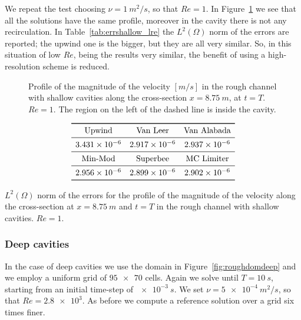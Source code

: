 We repeat the test choosing $\nu=\SI{1}{m^2/s}$, so that $Re=1$. In 
Figure~\ref{fig:linecompshallowlre} we see that all the solutions have the same 
profile, moreover in the cavity there is not any recirculation. In 
Table~\ref{tab:errshallow_lre} the $L^2(\Omega)$ norm of the errors are 
reported; the 
upwind one is 
the bigger, but they are all very similar. So, in this situation of low $Re$, 
being the results very similar, the benefit of using a high-resolution scheme 
is reduced.
\begin{figure}
	\centering
	
	\caption[Profile of the magnitude of the velocity in the rough channel with 
	shallow cavities at $Re=1$]{Profile of the magnitude of the velocity 
	$[\si{m/s}]$ in the rough channel with shallow cavities along the 
	cross-section 
	$x=\SI{8.75}{m}$, at $t=T$. $Re=1$. The region on the left of the 
	dashed line is inside the cavity.}
	\label{fig:linecompshallowlre}
\end{figure}
\begin{table}
	\centering
	\[
	\begin{array}{ccc}
	\toprule
	\text{Upwind} & \text{Van Leer} & \text{Van Alabada}\\
	\midrule
	\num{3.431e-6} & \num{2.917e-6} & \num{2.937e-6}\\
	\midrule
	\text{Min-Mod} & \text{Superbee} & \text{MC Limiter} \\ 
	\midrule
	\num{2.956e-6} & \num{2.899e-6} & \num{2.902e-6}\\
	\bottomrule
	\end{array}
	\]
	\caption[$L^2(\Omega)$ norm of the errors for the profile of the magnitude 
	of the 
	velocity in 
	the rough channel with shallow cavities at $Re=1$]{$L^2(\Omega)$ norm of 
	the errors for 
	the 
	profile of the magnitude of the velocity along the cross-section at 
	$x=\SI{8.75}{m}$ and $t=T$ in the rough channel with shallow 
	cavities. $Re = 1$.}
	\label{tab:errshallow_lre}
\end{table}
%
\subsubsection{Deep cavities}
In the case of deep cavities we use the domain in Figure~\ref{fig:roughdomdeep} 
and we employ a uniform grid of $\num{95x70}$ cells. Again we solve until 
$T=\SI{10}{s}$, starting from an initial time-step of $\SI{e-3}{s}$. We set 
$\nu=\SI{5e-4}{m^2/s}$, so that $Re=\num{2.8e3}$. As before we compute a 
reference solution over a grid six times finer.

